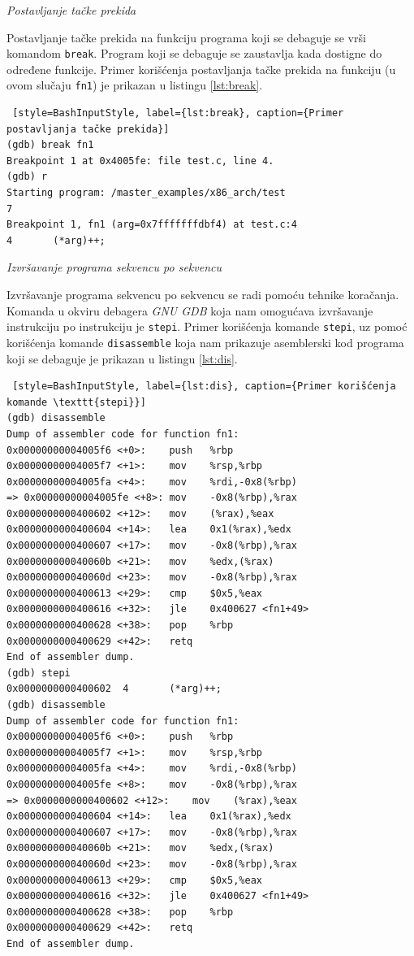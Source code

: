 \documentclass[12pt,oneside]{memoir}
\begin{document}
\begin{description}

\item{\emph{Postavljanje tačke prekida}}

Postavljanje tačke prekida na funkciju programa koji se debaguje se vrši komandom \texttt{break}. Program koji se debaguje se zaustavlja kada dostigne do određene funkcije. Primer korišćenja postavljanja tačke prekida na funkciju (u ovom slučaju \texttt{fn1}) je prikazan u listingu \ref{lst:break}.

\begin{lstlisting} [style=BashInputStyle, label={lst:break}, caption={Primer postavljanja tačke prekida}]
(gdb) break fn1
Breakpoint 1 at 0x4005fe: file test.c, line 4.
(gdb) r
Starting program: /master_examples/x86_arch/test 
7
Breakpoint 1, fn1 (arg=0x7fffffffdbf4) at test.c:4
4		(*arg)++;
\end{lstlisting}

\item{\emph{Izvršavanje programa sekvencu po sekvencu}}

Izvršavanje programa sekvencu po sekvencu se radi pomoću tehnike koračanja. Komanda u okviru debagera \emph{GNU GDB} koja nam omogućava izvršavanje instrukciju po instrukciju je \texttt{stepi}. Primer korišćenja komande \texttt{stepi}, uz pomoć korišćenja komande \texttt{disassemble} koja nam prikazuje asemblerski kod programa koji se debaguje je prikazan u listingu \ref{lst:dis}.\newpage

\begin{lstlisting} [style=BashInputStyle, label={lst:dis}, caption={Primer korišćenja komande \texttt{stepi}}]
(gdb) disassemble
Dump of assembler code for function fn1:
0x00000000004005f6 <+0>:	push   %rbp
0x00000000004005f7 <+1>:	mov    %rsp,%rbp
0x00000000004005fa <+4>:	mov    %rdi,-0x8(%rbp)
=> 0x00000000004005fe <+8>:	mov    -0x8(%rbp),%rax
0x0000000000400602 <+12>:	mov    (%rax),%eax
0x0000000000400604 <+14>:	lea    0x1(%rax),%edx
0x0000000000400607 <+17>:	mov    -0x8(%rbp),%rax
0x000000000040060b <+21>:	mov    %edx,(%rax)
0x000000000040060d <+23>:	mov    -0x8(%rbp),%rax
0x0000000000400613 <+29>:	cmp    $0x5,%eax
0x0000000000400616 <+32>:	jle    0x400627 <fn1+49>
0x0000000000400628 <+38>:	pop    %rbp
0x0000000000400629 <+42>:	retq   
End of assembler dump.
(gdb) stepi
0x0000000000400602	4		(*arg)++;
(gdb) disassemble 
Dump of assembler code for function fn1:
0x00000000004005f6 <+0>:	push   %rbp
0x00000000004005f7 <+1>:	mov    %rsp,%rbp
0x00000000004005fa <+4>:	mov    %rdi,-0x8(%rbp)
0x00000000004005fe <+8>:	mov    -0x8(%rbp),%rax
=> 0x0000000000400602 <+12>:	mov    (%rax),%eax
0x0000000000400604 <+14>:	lea    0x1(%rax),%edx
0x0000000000400607 <+17>:	mov    -0x8(%rbp),%rax
0x000000000040060b <+21>:	mov    %edx,(%rax)
0x000000000040060d <+23>:	mov    -0x8(%rbp),%rax
0x0000000000400613 <+29>:	cmp    $0x5,%eax
0x0000000000400616 <+32>:	jle    0x400627 <fn1+49>
0x0000000000400628 <+38>:	pop    %rbp
0x0000000000400629 <+42>:	retq   
End of assembler dump.
\end{lstlisting}


\end{description}
\end{document}
